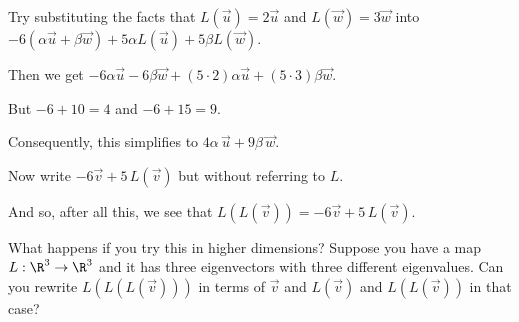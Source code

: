 \documentclass{ximera}
\begin{document}
\begin{question}
\begin{solution}
    \begin{hint}
      Try substituting the facts that $L(\vec{u}) = 2 \vec{u}$ and $L(\vec{w}) = 3 \vec{w}$ into $-6 \left( \alpha \vec{u} + \beta \vec{w} \right) + 5 \alpha L(\vec{u}) + 5 \beta L(\vec{w})$.
    \end{hint}    

    \begin{hint}
      Then we get $-6 \alpha \vec{u} - 6 \beta \vec{w} + (5 \cdot 2) \alpha \vec{u} + (5 \cdot 3) \beta \vec{w}$.
    \end{hint}    

    \begin{hint}
      But $-6 + 10 = 4$ and $-6 + 15 = 9$.
    \end{hint}    

    \begin{hint}
      Consequently, this simplifies to $4\alpha\,\vec{u} + 9\beta\,\vec{w}$.
    \end{hint}    

    Now write $-6 \vec{v} + 5 \, L(\vec{v})$ but without referring to $L$.
    \begin{multiple-choice}
    \end{multiple-choice} 
  \end{solution}

  And so, after all this, we see that $L(L(\vec{v})) = -6 \vec{v} + 5 \, L(\vec{v})$.

  What happens if you try this in higher dimensions?  Suppose you have
  a map $L : \R^3 \to \R^3$ and it has three eigenvectors with three
  different eigenvalues.  Can you rewrite $L(L(L(\vec{v})))$ in terms
  of $\vec{v}$ and $L(\vec{v})$ and $L(L(\vec{v}))$ in that case?

\end{question}
\end{document}
